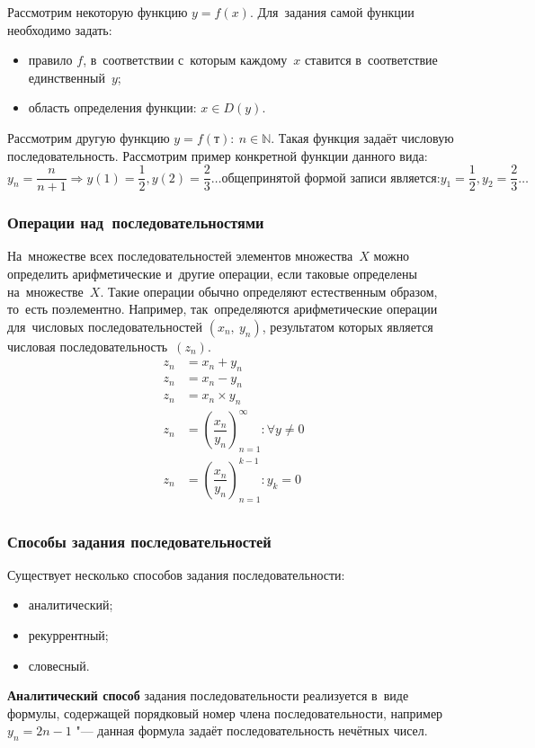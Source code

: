 \documentclass[]{scrartcl}
\begin{document}
{{Рассмотрим некоторую функцию ${\textstyle y=f(x)}$. Для~задания самой функции необходимо задать:
	\begin{itemize}
		\item правило ${\textstyle f}$, в~соответствии с~которым каждому~${\textstyle x}$ ставится в~соответствие единственный~${\textstyle y}$;
		\item область определения функции: ${\textstyle x \in D(y)}$.
	\end{itemize}
Рассмотрим другую функцию ${\textstyle y=f(т):\ n \in \mathbb{N}}$. Такая функция задаёт числовую последовательность. Рассмотрим пример конкретной функции данного вида:
\begin{equation*}\label{eq:numerical-sequence-example}
y_n=\frac{n}{n+1}\Rightarrow y(1)=\frac{1}{2}, y(2)=\frac{2}{3}\ldots \text{общепринятой формой записи является:} y_1=\frac{1}{2}, y_2=\frac{2}{3}\ldots
\end{equation*}

\subsubsection{Операции над~последовательностями}
На~множестве всех последовательностей элементов множества~${\textstyle X}$ можно определить арифметические и~другие операции, если таковые определены на~множестве~${\textstyle X}$. Такие операции обычно определяют естественным образом, то~есть поэлементно. Например, так~определяются арифметические операции для~числовых последовательностей ${\textstyle (x_n,\ y_n)}$, результатом которых является числовая последовательность~${\textstyle (z_n)}$.
\begin{equation}\label{eq:numerical-sequences-arifmetic}
	\begin{aligned}
	z_n&=x_n + y_n\\
	z_n&=x_n - y_n\\
	z_n&=x_n \times y_n\\
	z_n&=(\dfrac{x_n}{y_n})_{n=1}^\infty:\forall y\neq 0\\
	z_n&=(\dfrac{x_n}{y_n})_{n=1}^{k-1}:y_k=0\\
	\end{aligned}
\end{equation} 

\subsubsection{Способы задания последовательностей}
Существует несколько способов задания последовательности:
\begin{itemize}
	\item аналитический;
	\item рекуррентный;
	\item словесный.
	\end{itemize}
\textbf{Аналитический способ} задания последовательности реализуется в~виде формулы, содержащей порядковый номер члена последовательности, например ${\textstyle y_n=2n-1}$ "--- данная формула задаёт последовательность нечётных чисел.

}}
\end{document}
